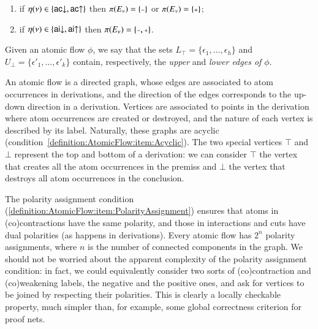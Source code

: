\begin{definition}
\begin{enumerate}
\begin{enumerate}
\item if $\eta(\nu)\in\{{{\mathsf{ac}}{\downarrow}},{{\mathsf{ac}}{\uparrow}}\}$ then $\pi(E_\nu)=\{\pmi\}$ or $\pi(E_\nu)=\{\ppl\}$;
\item if $\eta(\nu)\in\{{{\mathsf{ai}}{\downarrow}},{{\mathsf{ai}}{\uparrow}}\}$ then $\pi(E_\nu)=\{\pmi,\ppl\}$.
\end{enumerate}
\end{enumerate}
Given an atomic flow $\phi$, we say that the sets $L_\top=\{\epsilon_1,\dots,\epsilon_h\}$ and $U_\bot=\{\epsilon'_1,\dots,\epsilon'_k\}$ contain, respectively, the \emph{upper} and \emph{lower edges of $\phi$}.
\end{definition}

An atomic flow is a directed graph, whose edges are associated to atom occurrences in derivations, and the direction of the edges corresponds to the up-down direction in a derivation. Vertices are associated to points in the derivation where atom occurrences are created or destroyed, and the nature of each vertex is described by its label. Naturally, these graphs are acyclic (condition~\ref{definition:AtomicFlow:item:Acyclic}). The two special vertices $\top$ and $\bot$ represent the top and bottom of a derivation: we can consider $\top$ the vertex that creates all the atom occurrences in the premiss and $\bot$ the vertex that destroys all atom occurrences in the conclusion.

The polarity assignment condition (\ref{definition:AtomicFlow:item:PolarityAssignment}) ensures that atoms in (co)contractions have the same polarity, and those in interactions and cuts have dual polarities (as happens in derivations). Every atomic flow has $2^n$ polarity assignments, where $n$ is the number of connected components in the graph. We should not be worried about the apparent complexity of the polarity assignment condition: in fact, we could equivalently consider two sorts of (co)contraction and (co)weakening labels, the negative and the positive ones, and ask for vertices to be joined by respecting their polarities. This is clearly a locally checkable property, much simpler than, for example, some global correctness criterion for proof nets.

